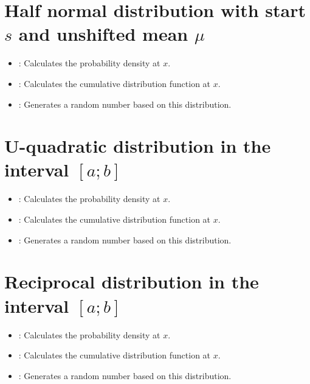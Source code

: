 \section{Half normal distribution with start \texorpdfstring{$s$}{s} and unshifted mean \texorpdfstring{$\mu$}{mu}}

\begin{itemize}

\item
{}:
Calculates the probability density at $x$.

\item
{}:
Calculates the cumulative distribution function at $x$.

\item
{}:
Generates a random number based on this distribution.

\end{itemize}



\section{U-quadratic distribution  in the interval \texorpdfstring{$[a;b]$}{[a;b]}}

\begin{itemize}

\item
{}:
Calculates the probability density at $x$.

\item
{}:
Calculates the cumulative distribution function at $x$.

\item
{}:
Generates a random number based on this distribution.

\end{itemize}



\section{Reciprocal distribution in the interval \texorpdfstring{$[a;b]$}{[a;b]}}

\begin{itemize}

\item
{}:
Calculates the probability density at $x$.

\item
{}:
Calculates the cumulative distribution function at $x$.

\item
{}:
Generates a random number based on this distribution.

\end{itemize}



